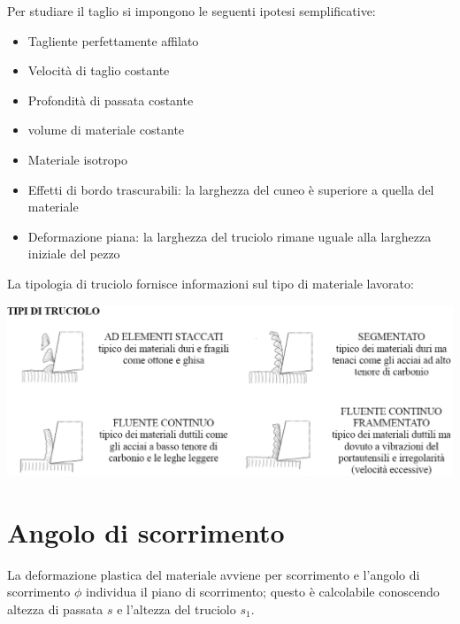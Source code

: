 \documentclass[a4paper, 15pt]{article}
\newcommand{\compresslist}{ %
			\setlength{\itemsep}{1pt}
			\setlength{\parskip}{0pt}
			\setlength{\parsep}{0pt}
		}
\begin{document}
	Per studiare il taglio si impongono le seguenti ipotesi semplificative:
	\begin{itemize}\compresslist
		\item Tagliente perfettamente affilato
		\item Velocità di taglio costante
		\item Profondità di passata costante
		\item volume di materiale costante
		\item Materiale isotropo
		\item Effetti di bordo trascurabili: la larghezza del cuneo è superiore a quella del materiale
		\item Deformazione piana: la larghezza del truciolo rimane uguale alla larghezza iniziale del pezzo
	\end{itemize}
\newpage
	La tipologia di truciolo fornisce informazioni sul tipo di materiale lavorato:
\begin{center}
	\includegraphics[width=1.2\linewidth]{figures/asp3}
\end{center}

\section{Angolo di scorrimento}
	La deformazione plastica del materiale avviene per scorrimento e l'angolo di scorrimento $\phi$ individua il piano di scorrimento; questo è calcolabile conoscendo altezza di passata $s$ e l'altezza del truciolo $s_1$. 
	
\end{document}
